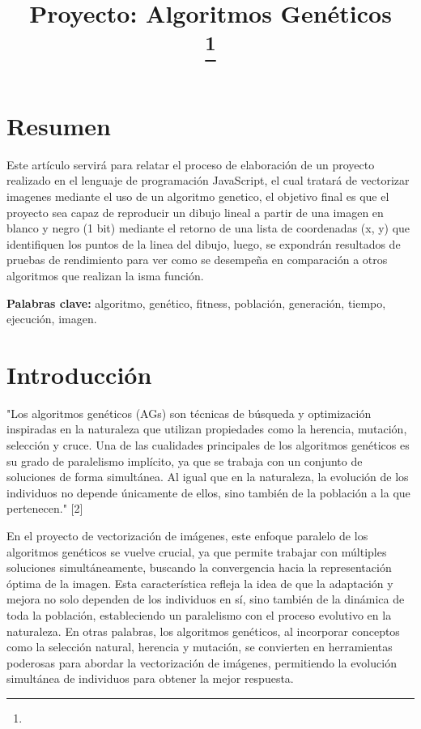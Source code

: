 \documentclass[conference]{IEEEtran}
\begin{document}
\title{Proyecto: Algoritmos Genéticos\\

\thanks{}
}

\author{

\and
{}

\and
{}

}

\maketitle





\section{Resumen}
Este artículo servirá para relatar el proceso de elaboración de un proyecto realizado en el lenguaje de programación JavaScript, el cual tratará de vectorizar imagenes mediante el uso de un algoritmo genetico, el objetivo final es que el proyecto sea capaz de reproducir un dibujo lineal a partir de una imagen en blanco y negro (1 bit) mediante el retorno de una lista de coordenadas (x, y) que identifiquen los puntos de la linea del dibujo, luego, se expondrán resultados de pruebas de rendimiento para ver como se desempeña en comparación a otros algoritmos que realizan la isma función.


\textbf{Palabras clave:} algoritmo, genético, fitness, población, generación, tiempo, ejecución, imagen.
\section{Introducción}

"Los algoritmos genéticos (AGs) son técnicas de búsqueda y optimización inspiradas en la naturaleza que utilizan propiedades como la herencia, mutación, selección y cruce. Una de las cualidades principales de los algoritmos genéticos es su grado de paralelismo implícito, ya que se trabaja con un conjunto de soluciones de forma simultánea. Al igual que en la naturaleza, la evolución de los individuos no depende únicamente de ellos, sino también de la población a la que pertenecen." [2]

En el proyecto de vectorización de imágenes, este enfoque paralelo de los algoritmos genéticos se vuelve crucial, ya que permite trabajar con múltiples soluciones simultáneamente, buscando la convergencia hacia la representación óptima de la imagen. Esta característica refleja la idea de que la adaptación y mejora no solo dependen de los individuos en sí, sino también de la dinámica de toda la población, estableciendo un paralelismo con el proceso evolutivo en la naturaleza. En otras palabras, los algoritmos genéticos, al incorporar conceptos como la selección natural, herencia y mutación, se convierten en herramientas poderosas para abordar la vectorización de imágenes, permitiendo la evolución simultánea de individuos para obtener la mejor respuesta. 
\end{document}
